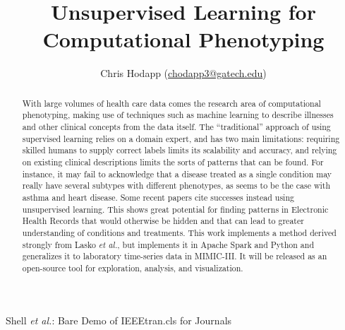 \documentclass[journal]{IEEEtran}
\begin{document}
%
\title{Unsupervised Learning for Computational Phenotyping}


%
%
%

\author{Chris Hodapp (\url{chodapp3@gatech.edu})
}

%
{Shell \MakeLowercase{\textit{et al.}}: Bare Demo of IEEEtran.cls for Journals}

\maketitle

\begin{abstract}
With large volumes of health care data comes the research area of
computational phenotyping, making use of techniques such as machine
learning to describe illnesses and other clinical concepts from the
data itself.  The ``traditional'' approach of using supervised
learning relies on a domain expert, and has two main limitations:
requiring skilled humans to supply correct labels limits its
scalability and accuracy, and relying on existing clinical
descriptions limits the sorts of patterns that can be found. For
instance, it may fail to acknowledge that a disease treated as a
single condition may really have several subtypes with different
phenotypes, as seems to be the case with asthma and heart
disease. Some recent papers cite successes instead using unsupervised
learning.  This shows great potential for finding patterns in
Electronic Health Records that would otherwise be hidden and that can
lead to greater understanding of conditions and treatments. This work
implements a method derived strongly from Lasko \emph{et al.}, but
implements it in Apache Spark and Python and generalizes it to
laboratory time-series data in MIMIC-III.  It will be released as an
open-source tool for exploration, analysis, and visualization.
\end{abstract}
\end{document}
